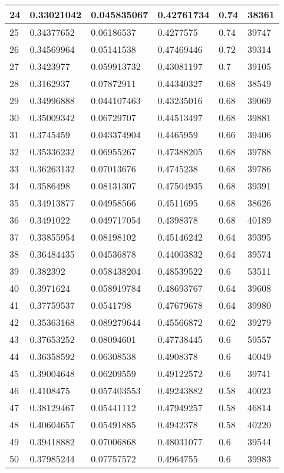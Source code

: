 \begin{longtable}{|l|l|l|l|l|l|}
24 & 0.33021042 & 0.045835067 & 0.42761734 & 0.74 & 38361 \\ \hline 
25 & 0.34377652 & 0.06186537 & 0.4277575 & 0.74 & 39747 \\ \hline 
26 & 0.34569964 & 0.05141538 & 0.47469446 & 0.72 & 39314 \\ \hline 
27 & 0.3423977 & 0.059913732 & 0.43081197 & 0.7 & 39105 \\ \hline 
28 & 0.3162937 & 0.07872911 & 0.44340327 & 0.68 & 38549 \\ \hline 
29 & 0.34996888 & 0.044107463 & 0.43235016 & 0.68 & 39069 \\ \hline 
30 & 0.35009342 & 0.06729707 & 0.44513497 & 0.68 & 39881 \\ \hline 
31 & 0.3745459 & 0.043374904 & 0.4465959 & 0.66 & 39406 \\ \hline 
32 & 0.35336232 & 0.06955267 & 0.47388205 & 0.68 & 39788 \\ \hline 
33 & 0.36263132 & 0.07013676 & 0.4745238 & 0.68 & 39786 \\ \hline 
34 & 0.3586498 & 0.08131307 & 0.47504935 & 0.68 & 39391 \\ \hline 
35 & 0.34913877 & 0.04958566 & 0.4511695 & 0.68 & 38626 \\ \hline 
36 & 0.3491022 & 0.049717054 & 0.4398378 & 0.68 & 40189 \\ \hline 
37 & 0.33855954 & 0.08198102 & 0.45146242 & 0.64 & 39395 \\ \hline 
38 & 0.36484435 & 0.04536878 & 0.44003832 & 0.64 & 39574 \\ \hline 
39 & 0.382392 & 0.058438204 & 0.48539522 & 0.6 & 53511 \\ \hline 
40 & 0.3971624 & 0.058919784 & 0.48693767 & 0.64 & 39608 \\ \hline 
41 & 0.37759537 & 0.0541798 & 0.47679678 & 0.64 & 39980 \\ \hline 
42 & 0.35363168 & 0.089279644 & 0.45566872 & 0.62 & 39279 \\ \hline 
43 & 0.37653252 & 0.08094601 & 0.47738445 & 0.6 & 59557 \\ \hline 
44 & 0.36358592 & 0.06308538 & 0.4908378 & 0.6 & 40049 \\ \hline 
45 & 0.39004648 & 0.06209559 & 0.49122572 & 0.6 & 39741 \\ \hline 
46 & 0.4108475 & 0.057403553 & 0.49243882 & 0.58 & 40023 \\ \hline 
47 & 0.38129467 & 0.05441112 & 0.47949257 & 0.58 & 46814 \\ \hline 
48 & 0.40604657 & 0.05491885 & 0.4942378 & 0.58 & 40220 \\ \hline 
49 & 0.39418882 & 0.07006868 & 0.48031077 & 0.6 & 39544 \\ \hline 
50 & 0.37985244 & 0.07757572 & 0.4964755 & 0.6 & 39983 \\ \hline 
\end{longtable}